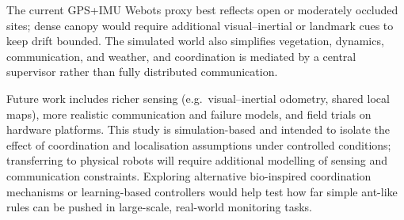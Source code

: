 \documentclass[lettersize,journal]{IEEEtran}
\begin{document}
The current GPS+IMU Webots proxy best reflects open or moderately occluded
sites; dense canopy would require additional visual–inertial or landmark cues
to keep drift bounded. The simulated world also simplifies vegetation,
dynamics, communication, and weather, and coordination is mediated by a central
supervisor rather than fully distributed communication.

Future work includes richer sensing (e.g.\ visual–inertial odometry, shared
local maps), more realistic communication and failure models, and field trials
on hardware platforms. This study is simulation-based and intended to isolate the effect of coordination and localisation assumptions under controlled conditions; transferring to physical robots will require additional modelling of sensing and communication constraints. Exploring alternative bio-inspired coordination
mechanisms or learning-based controllers would help test how far simple
ant-like rules can be pushed in large-scale, real-world monitoring tasks.
\end{document}

